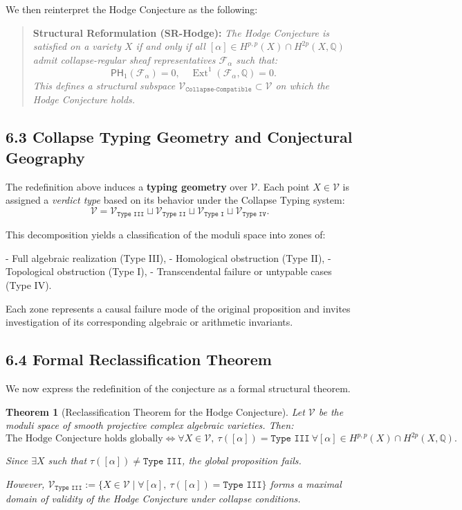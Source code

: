 \documentclass[11pt]{article}
\newtheorem{theorem}{Theorem}[section]
\DeclareMathOperator{\Ext}{Ext}
\begin{document}
We then reinterpret the Hodge Conjecture as the following:

\begin{quote}
\textbf{Structural Reformulation (SR-Hodge):}  
\emph{The Hodge Conjecture is satisfied on a variety $X$ if and only if all $[\alpha] \in H^{p,p}(X) \cap H^{2p}(X, \mathbb{Q})$ admit collapse-regular sheaf representatives $\mathcal{F}_\alpha$ such that:}
\[
\mathsf{PH}_1(\mathcal{F}_\alpha) = 0, \quad \Ext^1(\mathcal{F}_\alpha, \mathbb{Q}) = 0.
\]
\emph{This defines a structural subspace $\mathcal{V}_{\texttt{Collapse-Compatible}} \subset \mathcal{V}$ on which the Hodge Conjecture holds.}
\end{quote}

\subsection{6.3 Collapse Typing Geometry and Conjectural Geography}

The redefinition above induces a \textbf{typing geometry} over $\mathcal{V}$. Each point $X \in \mathcal{V}$ is assigned a \emph{verdict type} based on its behavior under the Collapse Typing system:
\[
\mathcal{V} = \mathcal{V}_{\texttt{Type III}} \sqcup \mathcal{V}_{\texttt{Type II}} \sqcup \mathcal{V}_{\texttt{Type I}} \sqcup \mathcal{V}_{\texttt{Type IV}}.
\]

This decomposition yields a classification of the moduli space into zones of:

- Full algebraic realization (Type III),
- Homological obstruction (Type II),
- Topological obstruction (Type I),
- Transcendental failure or untypable cases (Type IV).

Each zone represents a causal failure mode of the original proposition and invites investigation of its corresponding algebraic or arithmetic invariants.

\subsection{6.4 Formal Reclassification Theorem}

We now express the redefinition of the conjecture as a formal structural theorem.

\begin{theorem}[Reclassification Theorem for the Hodge Conjecture]
Let $\mathcal{V}$ be the moduli space of smooth projective complex algebraic varieties. Then:
\[
\text{The Hodge Conjecture holds globally} \iff \forall X \in \mathcal{V}, \ \tau([\alpha]) = \texttt{Type III} \ \forall [\alpha] \in H^{p,p}(X) \cap H^{2p}(X, \mathbb{Q}).
\]

Since $\exists X$ such that $\tau([\alpha]) \ne \texttt{Type III}$, the global proposition fails.

However, $\mathcal{V}_{\texttt{Type III}} := \{ X \in \mathcal{V} \mid \forall [\alpha], \ \tau([\alpha]) = \texttt{Type III} \}$  
forms a maximal domain of validity of the Hodge Conjecture under collapse conditions.
\end{theorem}
\end{document}
